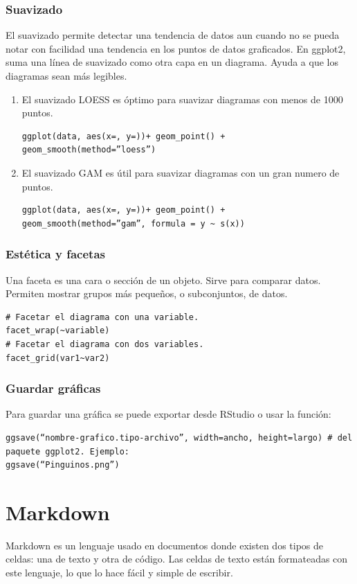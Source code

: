 \documentclass[a4paper, 12pt]{book}
\begin{document}
\subsection{Suavizado}
El suavizado permite detectar una tendencia de datos aun cuando no se pueda notar con facilidad una tendencia en los puntos de datos graficados. En ggplot2, suma una línea de suavizado como otra capa en un diagrama. Ayuda a que los diagramas sean más legibles.
\begin{enumerate}
\item El suavizado LOESS es óptimo para suavizar diagramas con menos de 1000 puntos.
\begin{verbatim}
ggplot(data, aes(x=, y=))+ geom_point() + geom_smooth(method=”loess”)
\end{verbatim}
\item El suavizado GAM es útil para suavizar diagramas con un gran numero de puntos.
\begin{verbatim}
ggplot(data, aes(x=, y=))+ geom_point() +  geom_smooth(method=”gam”, formula = y ~ s(x))
\end{verbatim}
\end{enumerate}
\subsection{Estética y facetas}
Una faceta es una cara o sección de un objeto. Sirve para comparar datos. Permiten mostrar grupos más pequeños, o subconjuntos, de datos.
\begin{verbatim}
# Facetar el diagrama con una variable.
facet_wrap(~variable)
# Facetar el diagrama con dos variables.
facet_grid(var1~var2)
\end{verbatim}
\subsection{Guardar gráficas}
Para guardar una gráfica se puede exportar desde RStudio o usar la función:
\begin{verbatim} 
ggsave(“nombre-grafico.tipo-archivo”, width=ancho, height=largo) # del paquete ggplot2. Ejemplo:
ggsave(“Pinguinos.png”)
\end{verbatim}
%
\chapter{Markdown}
Markdown es un lenguaje usado en documentos donde existen dos tipos de celdas: una de texto y otra de código. Las celdas de texto están formateadas con este lenguaje, lo que lo hace fácil y simple de escribir.
\end{document}
